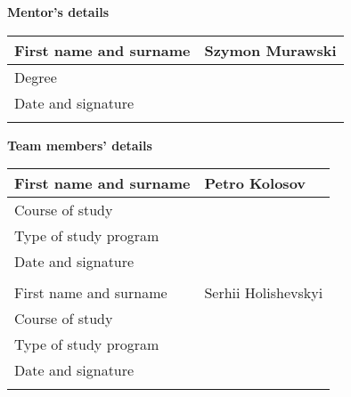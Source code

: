 \documentclass[
    12pt,
    english, %
    singlespacing, %
    oneside, %
]{MastersDoctoralThesis} %
\begin{document}
    \begin{partnerdetailspage}
        \textbf{Mentor's details} \\

        \begin{tabular}{|p{7cm}|p{7cm}|}
            \hline
            First name and surname & Szymon Murawski \\
            \hline
            Degree                 &                 \\
            \hline
            Date and signature     &                 \\
            \hline
            \multicolumn{2}{c}{\vspace{0.5cm}} \\
        \end{tabular}

        \textbf{Team members' details} \\

        \begin{tabular}{|p{7cm}|p{7cm}|}
            \hline
            First name and surname & Petro Kolosov        \\
            \hline
            Course of study        &                      \\
            \hline
            Type of study program  &                      \\
            \hline
            Date and signature     &                      \\
            \hline

            \multicolumn{2}{c}{\vspace{0.5cm}} \\

            \hline
            First name and surname & Serhii Holishevskyi  \\
            \hline
            Course of study        &                      \\
            \hline
            Type of study program  &                      \\
            \hline
            Date and signature     &                      \\
            \hline

            \multicolumn{2}{c}{\vspace{0.5cm}} \\


\end{tabular}
\end{partnerdetailspage}
\end{document}
